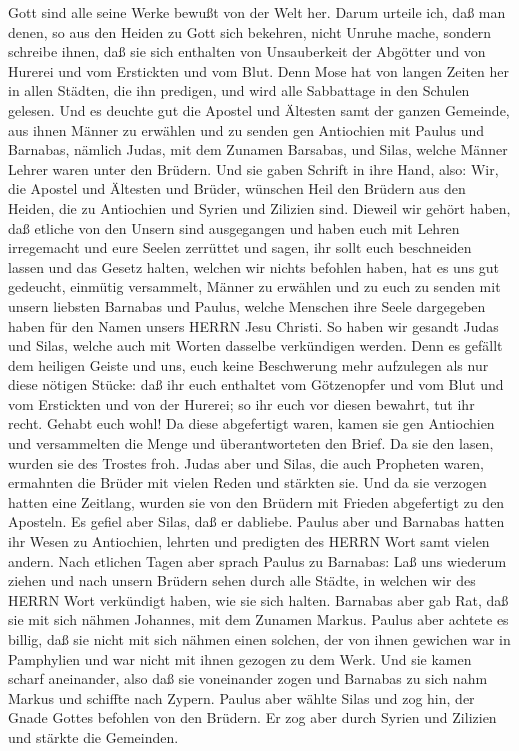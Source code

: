  Gott sind alle seine Werke bewußt von der Welt her.
 Darum urteile ich, daß man denen, so aus den Heiden zu
Gott sich bekehren, nicht Unruhe mache,  sondern schreibe
ihnen, daß sie sich enthalten von Unsauberkeit der Abgötter und von
Hurerei und vom Erstickten und vom Blut.  Denn Mose hat von
langen Zeiten her in allen Städten, die ihn predigen, und wird alle
Sabbattage in den Schulen gelesen.  Und es deuchte gut die
Apostel und Ältesten samt der ganzen Gemeinde, aus ihnen Männer zu
erwählen und zu senden gen Antiochien mit Paulus und Barnabas, nämlich
Judas, mit dem Zunamen Barsabas, und Silas, welche Männer Lehrer waren
unter den Brüdern.  Und sie gaben Schrift in ihre Hand,
also: Wir, die Apostel und Ältesten und Brüder, wünschen Heil den
Brüdern aus den Heiden, die zu Antiochien und Syrien und Zilizien sind.
 Dieweil wir gehört haben, daß etliche von den Unsern sind
ausgegangen und haben euch mit Lehren irregemacht und eure Seelen
zerrüttet und sagen, ihr sollt euch beschneiden lassen und das Gesetz
halten, welchen wir nichts befohlen haben,  hat es uns gut
gedeucht, einmütig versammelt, Männer zu erwählen und zu euch zu senden
mit unsern liebsten Barnabas und Paulus,  welche Menschen
ihre Seele dargegeben haben für den Namen unsers HERRN Jesu Christi.
 So haben wir gesandt Judas und Silas, welche auch mit
Worten dasselbe verkündigen werden.  Denn es gefällt dem
heiligen Geiste und uns, euch keine Beschwerung mehr aufzulegen als nur
diese nötigen Stücke:  daß ihr euch enthaltet vom
Götzenopfer und vom Blut und vom Erstickten und von der Hurerei; so ihr
euch vor diesen bewahrt, tut ihr recht. Gehabt euch wohl! 
Da diese abgefertigt waren, kamen sie gen Antiochien und versammelten
die Menge und überantworteten den Brief.  Da sie den lasen,
wurden sie des Trostes froh.  Judas aber und Silas, die
auch Propheten waren, ermahnten die Brüder mit vielen Reden und stärkten
sie.  Und da sie verzogen hatten eine Zeitlang, wurden sie
von den Brüdern mit Frieden abgefertigt zu den Aposteln. 
Es gefiel aber Silas, daß er dabliebe.  Paulus aber und
Barnabas hatten ihr Wesen zu Antiochien, lehrten und predigten des HERRN
Wort samt vielen andern.  Nach etlichen Tagen aber sprach
Paulus zu Barnabas: Laß uns wiederum ziehen und nach unsern Brüdern
sehen durch alle Städte, in welchen wir des HERRN Wort verkündigt haben,
wie sie sich halten.  Barnabas aber gab Rat, daß sie mit
sich nähmen Johannes, mit dem Zunamen Markus.  Paulus aber
achtete es billig, daß sie nicht mit sich nähmen einen solchen, der von
ihnen gewichen war in Pamphylien und war nicht mit ihnen gezogen zu dem
Werk.  Und sie kamen scharf aneinander, also daß sie
voneinander zogen und Barnabas zu sich nahm Markus und schiffte nach
Zypern.  Paulus aber wählte Silas und zog hin, der Gnade
Gottes befohlen von den Brüdern.  Er zog aber durch Syrien
und Zilizien und stärkte die Gemeinden.


